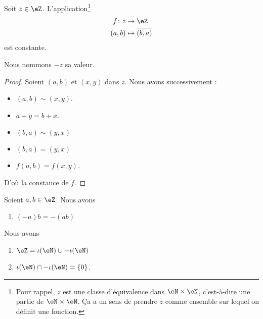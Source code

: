 \begin{lemmaDef}	\label{LEMooDEFRelatifOppose}
	Soit \( z\in \eZ\). L'application\footnote{Pour rappel, \( z\) est une classe d'équivalence dans \( \eN\times \eN\), c'est-à-dire une partie de \( \eN\times \eN\). Ça a un sens de prendre \( z\) comme ensemble sur lequel on définit une fonction.}
	\begin{equation}
		\begin{aligned}
			f\colon z & \to \eZ                    \\
			(a,b)     & \mapsto \overline{ (b,a) }
		\end{aligned}
	\end{equation}
	est constante.

	Nous nommons \( -z\) sa valeur.
\end{lemmaDef}

\begin{proof}
	Soient \( (a,b)\) et \( (x,y)\) dans \( z\). Nous avons successivement :
	\begin{itemize}
		\item
		      \( (a,b)\sim (x,y)\).
		\item
		      \( a+y=b+x\).
		\item
		      \( (b,a)\sim (y,x)\)
		\item
		      \( \overline{ (b,a) }=\overline{ (y,x) }\)
		\item
		      \( f(a,b)=f(x,y)\).
	\end{itemize}
	D'où la constance de \( f\).
\end{proof}

\begin{proposition}	\label{PROPooJMETooHQGwnv}
	Soient \( a,b\in \eZ\). Nous avons
	\begin{enumerate}
		\item		\label{ITEMooWNYGooMopPcq}
		      \( (-a)b=-(ab)\)
	\end{enumerate}
\end{proposition}


\begin{lemma}	\label{LEMooEntiersRelatifsSigne}
	Nous avons
	\begin{enumerate}
		\item       \label{ITEMooSQFGooQPgIMu}
		      \( \eZ=\iota(\eN)\cup -\iota(\eN)\)
		\item       \label{ITEMooHQUQooJeqULl}
		      \( \iota(\eN)\cap -\iota(\eN)=\{ 0 \}\).
	\end{enumerate}
\end{lemma}

